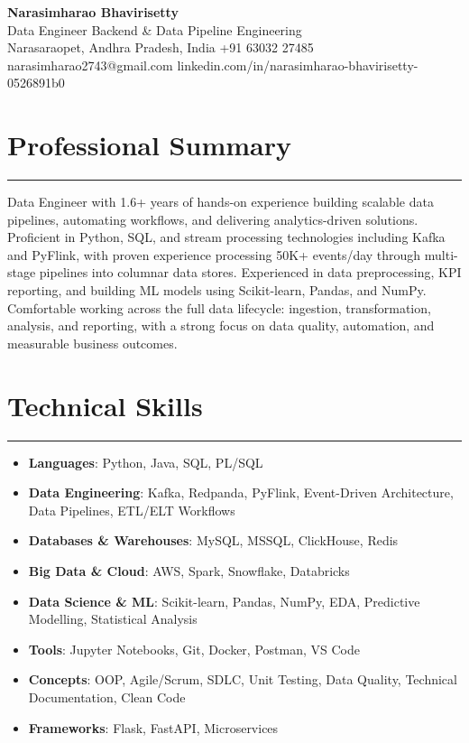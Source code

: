 \documentclass[12pt]{article}
\begin{document}
\begin{center}
  {\huge\textbf{Narasimharao Bhavirisetty}}\\[3pt]
  Data Engineer \textbullet{} Backend \& Data Pipeline Engineering \\[3pt]
  Narasaraopet, Andhra Pradesh, India \textbullet{} +91 63032 27485 \textbullet{} narasimharao2743@gmail.com \textbullet{} linkedin.com/in/narasimharao-bhavirisetty-0526891b0
\end{center}

\vspace{6pt}

\section*{Professional Summary}
\vspace{1pt}\hrule\vspace{4pt}
Data Engineer with 1.6+ years of hands-on experience building scalable data pipelines, automating workflows, and delivering analytics-driven solutions. Proficient in Python, SQL, and stream processing technologies including Kafka and PyFlink, with proven experience processing 50K+ events/day through multi-stage pipelines into columnar data stores. Experienced in data preprocessing, KPI reporting, and building ML models using Scikit-learn, Pandas, and NumPy. Comfortable working across the full data lifecycle: ingestion, transformation, analysis, and reporting, with a strong focus on data quality, automation, and measurable business outcomes.

\section*{Technical Skills}
\vspace{1pt}\hrule\vspace{4pt}
\begin{itemize}
  \item \textbf{Languages}: Python, Java, SQL, PL/SQL
  \item \textbf{Data Engineering}: Kafka, Redpanda, PyFlink, Event-Driven Architecture, Data Pipelines, ETL/ELT Workflows
  \item \textbf{Databases \& Warehouses}: MySQL, MSSQL, ClickHouse, Redis
  \item \textbf{Big Data \& Cloud}: AWS, Spark, Snowflake, Databricks
  \item \textbf{Data Science \& ML}: Scikit-learn, Pandas, NumPy, EDA, Predictive Modelling, Statistical Analysis
  \item \textbf{Tools}: Jupyter Notebooks, Git, Docker, Postman, VS Code
  \item \textbf{Concepts}: OOP, Agile/Scrum, SDLC, Unit Testing, Data Quality, Technical Documentation, Clean Code
  \item \textbf{Frameworks}: Flask, FastAPI, Microservices
\end{itemize}
\end{document}
